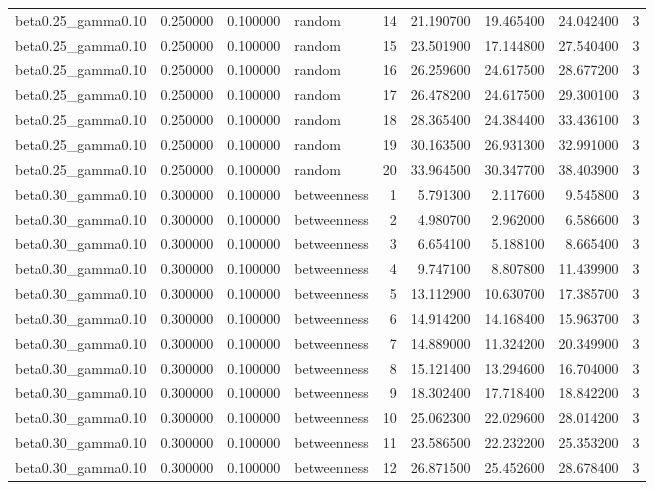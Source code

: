 \begin{tabular}{lrrlrrrrr}
beta0.25\_gamma0.10 & 0.250000 & 0.100000 & random & 14 & 21.190700 & 19.465400 & 24.042400 & 3 \\
beta0.25\_gamma0.10 & 0.250000 & 0.100000 & random & 15 & 23.501900 & 17.144800 & 27.540400 & 3 \\
beta0.25\_gamma0.10 & 0.250000 & 0.100000 & random & 16 & 26.259600 & 24.617500 & 28.677200 & 3 \\
beta0.25\_gamma0.10 & 0.250000 & 0.100000 & random & 17 & 26.478200 & 24.617500 & 29.300100 & 3 \\
beta0.25\_gamma0.10 & 0.250000 & 0.100000 & random & 18 & 28.365400 & 24.384400 & 33.436100 & 3 \\
beta0.25\_gamma0.10 & 0.250000 & 0.100000 & random & 19 & 30.163500 & 26.931300 & 32.991000 & 3 \\
beta0.25\_gamma0.10 & 0.250000 & 0.100000 & random & 20 & 33.964500 & 30.347700 & 38.403900 & 3 \\
beta0.30\_gamma0.10 & 0.300000 & 0.100000 & betweenness & 1 & 5.791300 & 2.117600 & 9.545800 & 3 \\
beta0.30\_gamma0.10 & 0.300000 & 0.100000 & betweenness & 2 & 4.980700 & 2.962000 & 6.586600 & 3 \\
beta0.30\_gamma0.10 & 0.300000 & 0.100000 & betweenness & 3 & 6.654100 & 5.188100 & 8.665400 & 3 \\
beta0.30\_gamma0.10 & 0.300000 & 0.100000 & betweenness & 4 & 9.747100 & 8.807800 & 11.439900 & 3 \\
beta0.30\_gamma0.10 & 0.300000 & 0.100000 & betweenness & 5 & 13.112900 & 10.630700 & 17.385700 & 3 \\
beta0.30\_gamma0.10 & 0.300000 & 0.100000 & betweenness & 6 & 14.914200 & 14.168400 & 15.963700 & 3 \\
beta0.30\_gamma0.10 & 0.300000 & 0.100000 & betweenness & 7 & 14.889000 & 11.324200 & 20.349900 & 3 \\
beta0.30\_gamma0.10 & 0.300000 & 0.100000 & betweenness & 8 & 15.121400 & 13.294600 & 16.704000 & 3 \\
beta0.30\_gamma0.10 & 0.300000 & 0.100000 & betweenness & 9 & 18.302400 & 17.718400 & 18.842200 & 3 \\
beta0.30\_gamma0.10 & 0.300000 & 0.100000 & betweenness & 10 & 25.062300 & 22.029600 & 28.014200 & 3 \\
beta0.30\_gamma0.10 & 0.300000 & 0.100000 & betweenness & 11 & 23.586500 & 22.232200 & 25.353200 & 3 \\
beta0.30\_gamma0.10 & 0.300000 & 0.100000 & betweenness & 12 & 26.871500 & 25.452600 & 28.678400 & 3 \\

\end{tabular}
